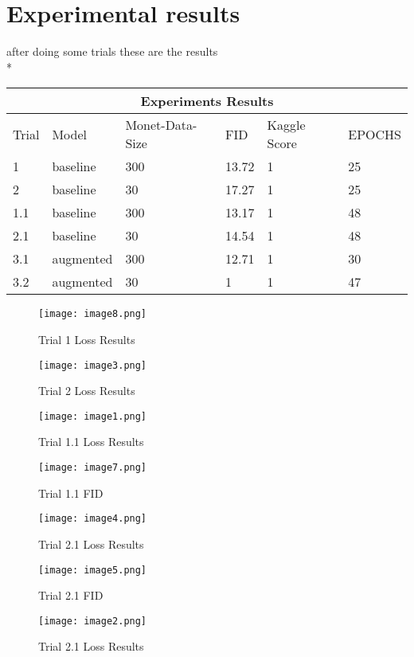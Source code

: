 \documentclass{article}
\begin{document}
\section{Experimental results}
after doing some trials these are the results\\*
    \begin{tabular}{ |p{1.5cm}|p{1.5cm}|p{1.5cm}| p{1.5cm}|p{1.5cm}|p{1.5cm}| }
    \hline
    \multicolumn{6}{|c|}{Experiments Results} \\
    \hline
    Trial & Model & Monet-Data-Size & FID & Kaggle Score & EPOCHS\\
    \hline
    1   & baseline & 300 & 13.72 & 1 & 25 \\
    2   & baseline & 30  & 17.27 & 1 & 25 \\
    1.1 & baseline & 300 & 13.17 & 1 & 48 \\
    2.1 & baseline & 30  & 14.54 & 1 & 48 \\
    3.1 & augmented & 300 & 12.71 & 1 & 30 \\
    3.2 & augmented & 30  & 1     & 1 & 47  \\
    \hline
    \end{tabular}
    \begin{figure}
        \texttt{[image: image8.png]}
        \caption{Trial 1 Loss Results}
    \end{figure}
    \begin{figure}
        \texttt{[image: image3.png]}
        \caption{Trial 2 Loss Results}
    \end{figure}
    \begin{figure}
        \texttt{[image: image1.png]}
        \caption{Trial 1.1 Loss Results}
    \end{figure}
    \begin{figure}
        \texttt{[image: image7.png]}
        \caption{Trial 1.1 FID}
    \end{figure}
    \begin{figure}
        \texttt{[image: image4.png]}
        \caption{Trial 2.1 Loss Results}
    \end{figure}
    \begin{figure}
        \texttt{[image: image5.png]}
        \caption{Trial 2.1 FID}
    \end{figure}
    \begin{figure}
        \texttt{[image: image2.png]}
        \caption{Trial 2.1 Loss Results}
    \end{figure}
\end{document}
